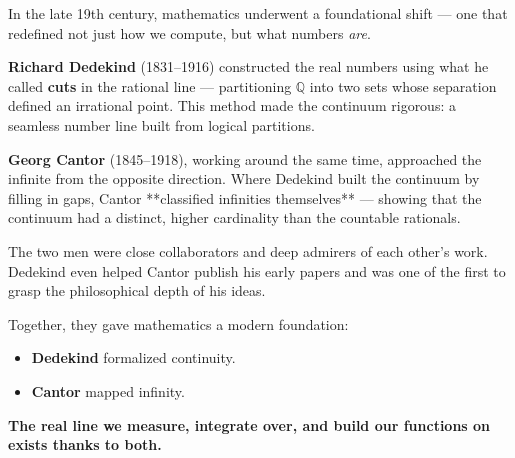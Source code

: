 \begin{tcolorbox}[colback=gray!5!white, colframe=black!80!white, title={Historical Sidebar: Dedekind and Cantor — Architects of the Infinite Continuum}]

  In the late 19th century, mathematics underwent a foundational shift — one that redefined not just how we compute, but what numbers \textit{are}.
  
  \textbf{Richard Dedekind} (1831–1916) constructed the real numbers using what he called \textbf{cuts} in the rational line — partitioning \( \mathbb{Q} \) into two sets whose separation defined an irrational point. This method made the continuum rigorous: a seamless number line built from logical partitions.
  
  \medskip
  
  \textbf{Georg Cantor} (1845–1918), working around the same time, approached the infinite from the opposite direction. Where Dedekind built the continuum by filling in gaps, Cantor **classified infinities themselves** — showing that the continuum had a distinct, higher cardinality than the countable rationals.
  
  \medskip
  
  The two men were close collaborators and deep admirers of each other’s work. Dedekind even helped Cantor publish his early papers and was one of the first to grasp the philosophical depth of his ideas.
  
  Together, they gave mathematics a modern foundation:
  \begin{itemize}
      \item \textbf{Dedekind} formalized continuity.
      \item \textbf{Cantor} mapped infinity.
  \end{itemize}
  
  \textbf{The real line we measure, integrate over, and build our functions on exists thanks to both.}
  
\end{tcolorbox}



